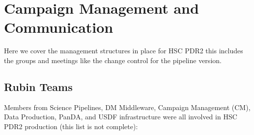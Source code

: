 \section{Campaign Management and Communication} \label{sec:management}

Here we cover the management structures in place for HSC PDR2 
this includes the groups and meetings like the change control for 
the pipeline version.

\subsection{Rubin Teams}

Members from Science Pipelines, DM Middleware, Campaign Management (CM), 
Data Production, PanDA, and USDF infrastructure were all involved in 
HSC PDR2 production (this list is not complete):

